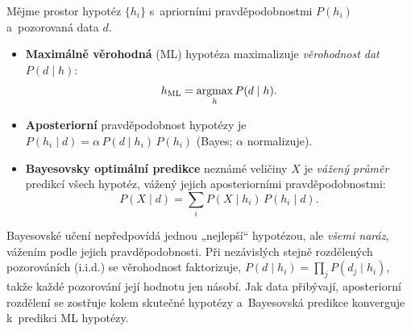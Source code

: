 \begin{definice}
Mějme prostor hypotéz $\{h_i\}$ s~apriorními pravděpodobnostmi $P(h_i)$ a~pozorovaná data $d$.
\begin{itemize}
  \item \textbf{Maximálně věrohodná} (ML) hypotéza maximalizuje \emph{věrohodnost dat} $P(d\mid h)$:
  \[ h_{\mathrm{ML}} = \operatorname*{argmax}_{h} P(d\mid h). \]
  \item \textbf{Aposteriorní} pravděpodobnost hypotézy je $P(h_i\mid d)=\alpha\,P(d\mid h_i)\,P(h_i)$ (Bayes; $\alpha$ normalizuje).
  \item \textbf{Bayesovsky optimální predikce} neznámé veličiny $X$ je \emph{vážený průměr} predikcí všech hypotéz, vážený jejich aposteriorními pravděpodobnostmi:
  \[ P(X\mid d) = \sum_i P(X\mid h_i)\,P(h_i\mid d). \]
\end{itemize}
\end{definice}

\begin{intuice}
Bayesovské učení nepředpovídá jednou „nejlepší`` hypotézou, ale \emph{všemi naráz}, vážením podle jejich pravděpodobnosti. Při nezávislých stejně rozdělených pozorováních (i.i.d.) se věrohodnost faktorizuje, $P(d\mid h_i)=\prod_j P(d_j\mid h_i)$, takže každé pozorování její hodnotu jen násobí. Jak data přibývají, aposteriorní rozdělení se zostřuje kolem skutečné hypotézy a~Bayesovská predikce konverguje k~predikci ML hypotézy.
\end{intuice}

